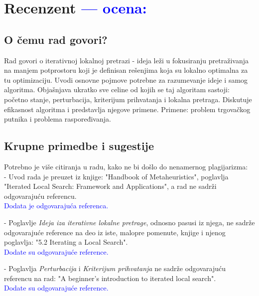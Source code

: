 \documentclass[a4paper]{report}
\newcommand{\odgovor}[1]{\textcolor{blue}{#1}}
\begin{document}
\chapter{Recenzent \odgovor{--- ocena:} }


\section{O čemu rad govori?}
Rad govori o iterativnoj lokalnoj pretrazi -  ideja leži u fokusiranju pretraživanja na manjem potprostoru koji je definisan rešenjima koja su lokalno optimalna za tu optimizaciju. Uvodi osnovne pojmove potrebne za razumevanje ideje i samog algoritma. Objašnjava ukratko sve celine od kojih se taj algoritam sastoji: početno stanje, perturbacija, kriterijum prihvatanja i lokalna pretraga. Diskutuje efikasnost algoritma i predstavlja njegove primene. Primene: problem trgovačkog putnika i problema raspoređivanja.

\section{Krupne primedbe i sugestije}
Potrebno je više citiranja u radu, kako ne bi došlo do nenamernog plagijarizma: \\

- Uvod rada je preuzet iz knjige: "Handbook of Metaheuristics", poglavlja "Iterated Local Search: Framework and Applications", a rad ne sadrži odgovarajuću referencu.\\
\odgovor{Dodata je odgovarajuća referenca.\\}

- Poglavlje {\em Ideja iza iterativne lokalne pretrage}, odnosno pasusi iz njega, ne sadrže odgovarajuće reference na deo iz iste, malopre pomenute, knjige i njenog poglavlja: "5.2 Iterating a Local Search".\\
\odgovor{Dodate su odgovarajuće reference.\\}

- Poglavlja {\em Perturbacija} i {\em Kriterijum prihvatanja} ne sadrže odgovarajuću referencu na rad: "A beginner's introduction to iterated local search".\\
\odgovor{Dodate su odgovarajuće reference.\\}
\end{document}
